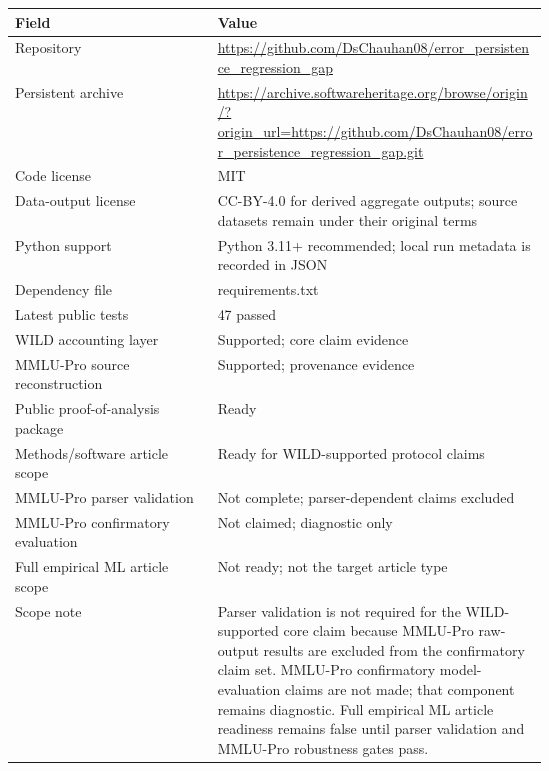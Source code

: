 \begin{tabular}{lp{0.62\linewidth}}
\toprule
Field & Value \\
\midrule
Repository & \url{https://github.com/DsChauhan08/error_persistence_regression_gap} \\
Persistent archive & \url{https://archive.softwareheritage.org/browse/origin/?origin_url=https://github.com/DsChauhan08/error_persistence_regression_gap.git} \\
Code license & MIT \\
Data-output license & CC-BY-4.0 for derived aggregate outputs; source datasets remain under their original terms \\
Python support & Python 3.11+ recommended; local run metadata is recorded in JSON \\
Dependency file & requirements.txt \\
Latest public tests & 47 passed \\
WILD accounting layer & Supported; core claim evidence \\
MMLU-Pro source reconstruction & Supported; provenance evidence \\
Public proof-of-analysis package & Ready \\
Methods/software article scope & Ready for WILD-supported protocol claims \\
MMLU-Pro parser validation & Not complete; parser-dependent claims excluded \\
MMLU-Pro confirmatory evaluation & Not claimed; diagnostic only \\
Full empirical ML article scope & Not ready; not the target article type \\
\midrule
Scope note & Parser validation is not required for the WILD-supported core claim because MMLU-Pro raw-output results are excluded from the confirmatory claim set. MMLU-Pro confirmatory model-evaluation claims are not made; that component remains diagnostic. Full empirical ML article readiness remains false until parser validation and MMLU-Pro robustness gates pass. \\
\bottomrule
\end{tabular}
